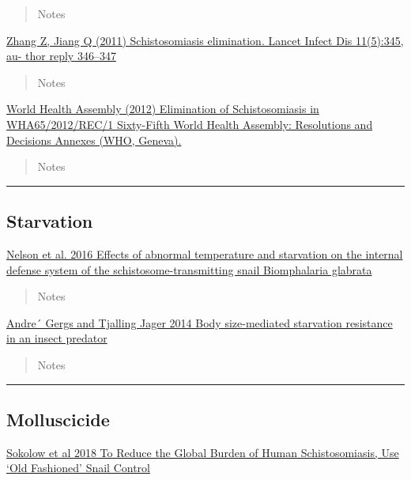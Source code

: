 \documentclass[10,portrait]{article}
\begin{document}
\begin{quote}
Notes
\end{quote}

\href{}{Zhang Z, Jiang Q (2011) Schistosomiasis elimination. Lancet
Infect Dis 11(5):345, au- thor reply 346--347}

\begin{quote}
Notes
\end{quote}

\href{}{World Health Assembly (2012) Elimination of Schistosomiasis in
WHA65/2012/REC/1 Sixty-Fifth World Health Assembly: Resolutions and
Decisions Annexes (WHO, Geneva).}

\begin{quote}
Notes
\end{quote}

\newpage  

\begin{center}\rule{0.5\linewidth}{\linethickness}\end{center}

\subsection{Starvation}\label{starvation}

\href{https://www.ncbi.nlm.nih.gov/pmc/articles/PMC4945359/}{Nelson et
al. 2016 Effects of abnormal temperature and starvation on the internal
defense system of the schistosome-transmitting snail Biomphalaria
glabrata}

\begin{quote}
Notes
\end{quote}

\href{https://besjournals.onlinelibrary.wiley.com/doi/pdf/10.1111/1365-2656.12195}{Andre´
Gergs and Tjalling Jager 2014 Body size-mediated starvation resistance
in an insect predator}

\begin{quote}
Notes
\end{quote}

\newpage  

\begin{center}\rule{0.5\linewidth}{\linethickness}\end{center}

\subsection{Molluscicide}\label{molluscicide}

\href{}{Sokolow et al 2018 To Reduce the Global Burden of Human
Schistosomiasis, Use `Old Fashioned' Snail Control}
\end{document}
